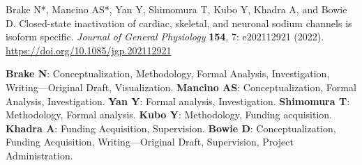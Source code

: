 \hangindent=1cm Brake N*, Mancino AS*, Yan Y, Shimomura T, Kubo Y, Khadra A, and Bowie D. Closed-state inactivation of cardiac, skeletal, and neuronal sodium channels is isoform specific. \textit{Journal of General Physiology} \textbf{154}, 7: e202112921 (2022). \url{https://doi.org/10.1085/jgp.202112921}

{\small \textbf{Brake N}: Conceptualization, Methodology, Formal Analysis, Investigation, Writing—Original Draft, Visualization.  \textbf{Mancino AS}: Conceptualization, Formal Analysis, Investigation. \textbf{Yan Y}: Formal analysis, Investigation. \textbf{Shimomura T}: Methodology, Formal analysis. \textbf{Kubo Y}: Methodology, Funding acquisition. \textbf{Khadra A}: Funding Acquisition, Supervision. \textbf{Bowie D}: Conceptualization, Funding Acquisition, Writing—Original Draft, Supervision, Project Administration.}

\setlength{\parskip}{6pt}
\setlength{\parindent}{17pt}